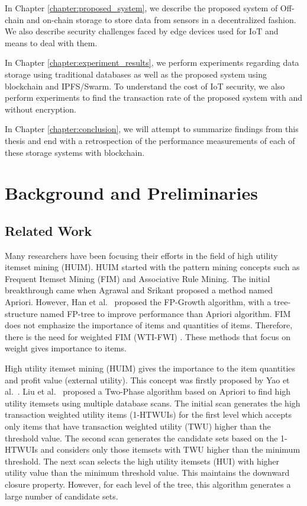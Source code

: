 \documentclass[11pt,openright]{report}
\begin{document}
\noindent In Chapter \ref{chapter:proposed_system}, we describe the proposed system of Off-chain and on-chain storage to store data from sensors in a decentralized fashion. We also describe security challenges faced by edge devices used for IoT and means to deal with them.\newline

\noindent In Chapter \ref{chapter:experiment_results}, we perform experiments regarding data storage using traditional databases as well as the proposed system using blockchain and IPFS/Swarm. To understand the cost of IoT security, we also perform experiments to find the transaction rate of the proposed system with and without encryption.\newline

\noindent In Chapter \ref{chapter:conclusion}, we will attempt to summarize findings from this thesis and end with a retrospection of the performance measurements of each of these storage systems with blockchain.\newline 



\chapter{Background and Preliminaries} \label{chapter:background}
\section{Related Work}\label{section:relatedwork}
Many researchers have been focusing their efforts in the field of high utility itemset mining (HUIM). HUIM started with the pattern mining concepts \cite{Chen1996, Barber2003, Li2005, Han2000} such as Frequent Itemset Mining (FIM) and Associative Rule Mining. The initial breakthrough came when Agrawal and Srikant \cite{Agrawal1994} proposed a method named Apriori. However, Han et al.~\cite{Han2000} proposed the FP-Growth algorithm, with a tree-structure named FP-tree to improve performance than Apriori algorithm. FIM does not emphasize the importance of items and quantities of items. Therefore, there is the need for weighted FIM (WTI-FWI) \cite{Yun2013, Yun2014}. These methods that focus on weight gives importance to items.

High utility itemset mining (HUIM) \cite{Ahmed2009, Yao2006, Erwin2007, Yen2007, Lin2011, Wu2012, Yao2004, Tseng2013} gives the importance to the item quantities and profit value (external utility). This concept was firstly proposed by Yao et al.~\cite{Yao2004}. Liu et al.~\cite{Liu2005} proposed a Two-Phase algorithm based on Apriori to find high utility itemsets using multiple database scans. The initial scan generates the high transaction weighted utility items (1-HTWUIs) for the first level which accepts only items that have transaction weighted utility (TWU) higher than the threshold value. The second scan generates the candidate sets based on the 1-HTWUIs and considers only those itemsets with TWU higher than the minimum threshold. The next scan selects the high utility itemsets (HUI) with higher utility value than the minimum threshold value. This maintains the downward closure property. However, for each level of the tree, this algorithm generates a large number of candidate sets. 
\end{document}
